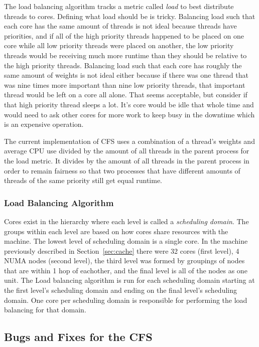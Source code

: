 \documentclass{sig-alternate}
\begin{document}
The load balancing algorithm tracks a metric called \emph{load} to best distribute threads to cores. Defining what load should be is tricky. Balancing load such that each core has the same amount of threads is not ideal because threads have priorities, and if all of the high priority threads happened to be placed on one core while all low priority threads were placed on another, the low priority threads would be receiving much more runtime than they should be relative to the high priority threads. Balancing load such that each core has roughly the same amount of weights is not ideal either because if there was one thread that was nine times more important than nine low priority threads, that important thread would be left on a core all alone. That seems acceptable, but consider if that high priority thread sleeps a lot. It's core would be idle that whole time and would need to ask other cores for more work to keep busy in the downtime which is an expensive operation.~\cite{Lozi:2016}

The current implementation of CFS uses a combination of a thread's weights and average CPU use divided by the amount of all threads in the parent process for the load metric. It divides by the amount of all threads in the parent process in order to remain fairness so that two processes that have different amounts of threads of the same priority still get equal runtime.~\cite{Lozi:2016}

\subsubsection{Load Balancing Algorithm}
\label{sec:loadbalancealg}

Cores exist in the hierarchy where each level is called a \emph{scheduling domain}. The groups within each level are based on how cores share resources with the machine. The lowest level of scheduling domain is a single core. In the machine previously described in Section~\ref{sec:cache} there were 32 cores (first level), 4 NUMA nodes (second level), the third level was formed by groupings of nodes that are within 1 hop of eachother, and the final level is all of the nodes as one unit.
The Load balancing algorithm is run for each scheduling domain starting at the first level's scheduling domain and ending on the final level's scheduling domain. One core per scheduling domain is responsible for performing the load balancing for that domain.


\subsection{Bugs and Fixes for the CFS}
\label{sec:cfsbugs}
\end{document}
